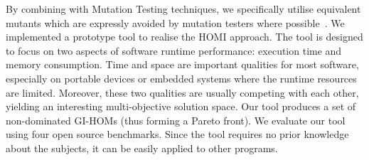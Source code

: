 \documentclass[oribibl]{llncs}
\begin{document}

By combining with Mutation Testing techniques, we specifically utilise equivalent mutants which are expressly avoided by mutation testers where possible~\cite{7194639}. 
We implemented a prototype tool to realise the HOMI approach. The tool is designed to focus on two aspects of software runtime performance: execution time and memory consumption. Time and space are important qualities for most software, especially on portable devices or embedded systems where the runtime resources are limited. Moreover, these two qualities are usually competing with each other, yielding an interesting multi-objective solution space. Our tool produces a set of non-dominated GI-HOMs (thus forming a Pareto front). We evaluate our tool using four open source benchmarks. Since the tool requires no prior knowledge about the subjects, it can be easily applied to other programs.
\end{document}
